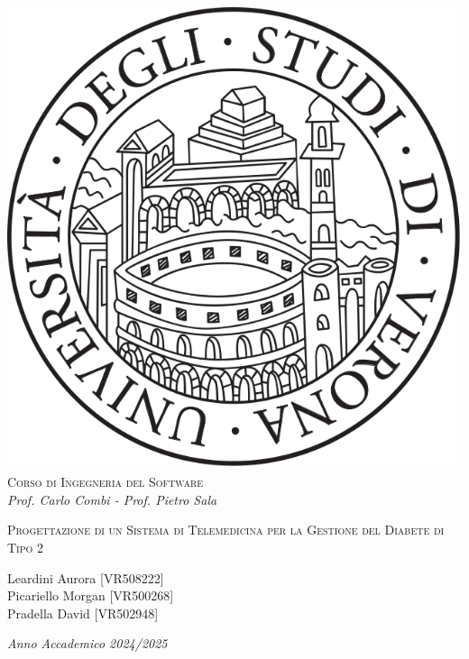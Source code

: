 \begin{titlepage}
\begin{center}
\begin{spacing}{1.5}
\includegraphics[width=.2\textwidth, height=.2\textheight, keepaspectratio]{figures/verona.png}\\
{{\Large{\textsc{Corso di Ingegneria del Software}}}}\\
{\large{\it Prof. Carlo Combi - Prof. Pietro Sala}}
\end{spacing}
\end{center}
\vspace{15mm}
\begin{center}
\begin{spacing}{1.5}

{\large }

{\LARGE{\textsc{Progettazione di un Sistema di Telemedicina per la Gestione del Diabete di Tipo 2}}}\\
\begin{center}
\vspace{35mm}
{\large{\textsc Leardini Aurora [VR508222] \\Picariello Morgan [VR500268] \\Pradella David [VR502948]}}
\end{center}
\end{spacing}
\end{center}
\par
\noindent
\vspace{45mm}
\begin{center}
{\large{\it Anno Accademico 2024/2025 }}
\end{center}
\end{titlepage}
